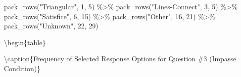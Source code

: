 \documentclass[
  letterpaper,
  DIV=11,
  numbers=noendperiod]{scrreprt}
\newenvironment{Shaded}{\begin{snugshade}}{\end{snugshade}}
\newcommand{\DecValTok}[1]{\textcolor[rgb]{0.68,0.00,0.00}{#1}}
\newcommand{\FunctionTok}[1]{\textcolor[rgb]{0.28,0.35,0.67}{#1}}
\newcommand{\NormalTok}[1]{\textcolor[rgb]{0.00,0.23,0.31}{#1}}
\newcommand{\SpecialCharTok}[1]{\textcolor[rgb]{0.37,0.37,0.37}{#1}}
\newcommand{\StringTok}[1]{\textcolor[rgb]{0.13,0.47,0.30}{#1}}
\begin{document}
\begin{Shaded}
\begin{Highlighting}[]
  \FunctionTok{pack\_rows}\NormalTok{(}\StringTok{"Triangular"}\NormalTok{, }\DecValTok{1}\NormalTok{, }\DecValTok{5}\NormalTok{) }\SpecialCharTok{\%\textgreater{}\%} 
  \FunctionTok{pack\_rows}\NormalTok{(}\StringTok{"Lines{-}Connect"}\NormalTok{, }\DecValTok{3}\NormalTok{, }\DecValTok{5}\NormalTok{) }\SpecialCharTok{\%\textgreater{}\%} 
  \FunctionTok{pack\_rows}\NormalTok{(}\StringTok{"Satisfice"}\NormalTok{, }\DecValTok{6}\NormalTok{, }\DecValTok{15}\NormalTok{) }\SpecialCharTok{\%\textgreater{}\%} 
  \FunctionTok{pack\_rows}\NormalTok{(}\StringTok{"Other"}\NormalTok{, }\DecValTok{16}\NormalTok{, }\DecValTok{21}\NormalTok{) }\SpecialCharTok{\%\textgreater{}\%} 
  \FunctionTok{pack\_rows}\NormalTok{(}\StringTok{"Unknown"}\NormalTok{, }\DecValTok{22}\NormalTok{, }\DecValTok{29}\NormalTok{) }
\end{Highlighting}
\end{Shaded}

\textbackslash begin\{table\}

\textbackslash caption\{\label{tab:Q3-IMPASSE-RESPONSES}Frequency of
Selected Response Options for Question \#3 (Impasse Condition)\}
\centering
\end{document}

